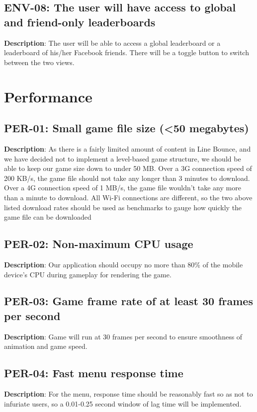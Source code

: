 \subsection{ENV-08: The user will have access to global and friend-only leaderboards}
\textbf{Description}: The user will be able to access a global leaderboard
or a leaderboard of his/her Facebook friends. There will be a toggle
button to switch between the two views.

\section{Performance}

\subsection{PER-01: Small game file size (<50 megabytes)}
\textbf{Description}: As there is a fairly limited amount of content in Line
Bounce, and we have decided not to implement a level-based game structure,
we should be able to keep our game size down to under 50 MB. Over
a 3G connection speed of 200 KB/s, the game file should not take any
longer than 3 minutes to download. Over a 4G connection speed of 1
MB/s, the game file wouldn\textquoteright{}t take any more than a
minute to download. All Wi-Fi connections are different, so the two
above listed download rates should be used as benchmarks to gauge
how quickly the game file can be downloaded

\subsection{PER-02: Non-maximum CPU usage}
\textbf{Description}: Our application should occupy no more than 80\% of the
mobile device\textquoteright{}s CPU during gameplay for rendering
the game. 

\subsection{PER-03: Game frame rate of at least 30 frames per second}
\textbf{Description}: Game will run at 30 frames per second to ensure smoothness
of animation and game speed.

\subsection{PER-04: Fast menu response time}
\textbf{Description}: For the menu, response time should be reasonably fast
so as not to infuriate users, so a 0.01-0.25 second window of lag
time will be implemented.

